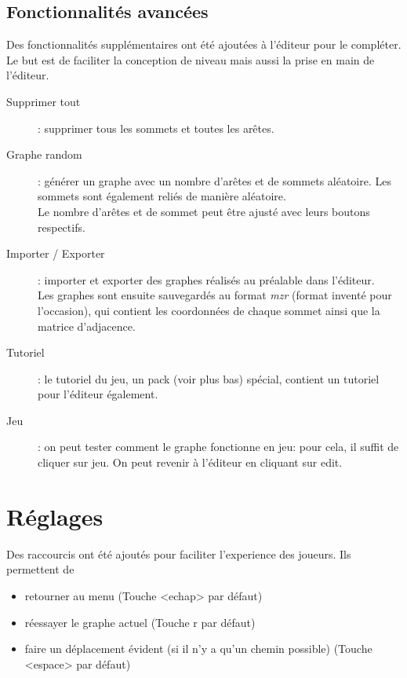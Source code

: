 \documentclass[12pt]{article}
\begin{document}
\subsection{Fonctionnalités avancées}
Des fonctionnalités supplémentaires ont été ajoutées à l'éditeur pour le compléter.\\
Le but est de faciliter la conception de niveau mais aussi la prise en main de l'éditeur.
\begin{description}
    \item[Supprimer tout]: supprimer tous les sommets et toutes les arêtes.
    
    \item[Graphe random]: générer un graphe avec un nombre d'arêtes et de sommets aléatoire. Les sommets sont également reliés de manière aléatoire.\\
    Le nombre d'arêtes et de sommet peut être ajusté avec leurs boutons respectifs.

    \item[Importer / Exporter]: importer et exporter des graphes réalisés au préalable dans l'éditeur.\\
    Les graphes sont ensuite sauvegardés au format \textit{mzr} (format inventé pour l'occasion), qui contient les coordonnées de chaque sommet ainsi que la matrice d'adjacence.

    \item[Tutoriel]: le tutoriel du jeu, un pack (voir plus bas) spécial, contient un tutoriel pour l'éditeur également.

    \item[Jeu]: on peut tester comment le graphe fonctionne en jeu: pour cela, il suffit de cliquer sur jeu. On peut revenir à l'éditeur en cliquant sur edit.
\end{description}

\section{Réglages}

Des raccourcis ont été ajoutés pour faciliter l'experience des joueurs. Ils permettent de
\begin{itemize}
    \item retourner au menu (Touche <echap> par défaut)
    \item réessayer le graphe actuel (Touche r par défaut)
    \item faire un déplacement évident (si il n'y a qu'un chemin possible) (Touche <espace> par défaut)
\end{itemize}
\end{document}
